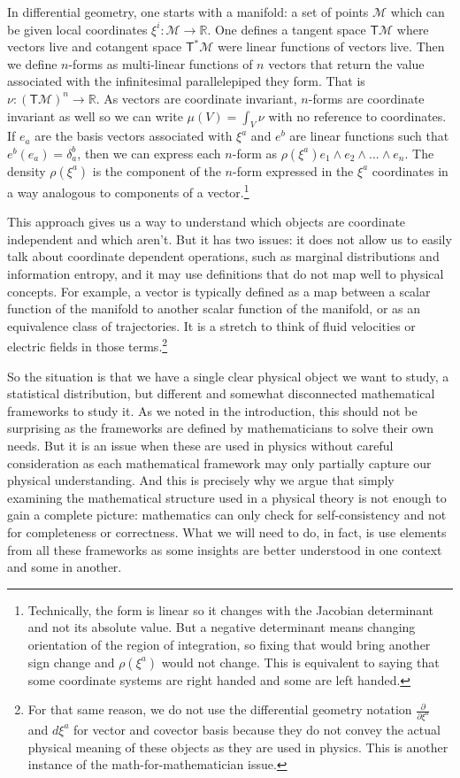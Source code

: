 \documentclass[11pt]{article}
\begin{document}
In differential geometry, one starts with a manifold: a set of points $\mathcal{M}$ which can be given local coordinates $\xi^i : \mathcal{M} \to \mathbb{R}$. One defines a tangent space $\mathsf{T}\mathcal{M}$ where vectors live and cotangent space $\mathsf{T}^*\mathcal{M}$ were linear functions of vectors live. Then we define $n$-forms as multi-linear functions of $n$ vectors that return the value associated with the infinitesimal parallelepiped they form. That is $\nu : (\mathsf{T}\mathcal{M})^n \rightarrow \mathbb{R}$. As vectors are coordinate invariant, $n$-forms are coordinate invariant as well so we can write $\mu(V)=\int_V \nu$ with no reference to coordinates. If $e_a$ are the basis vectors associated with $\xi^a$ and $e^b$ are linear functions such that $e^b(e_a)=\delta_a^b$, then we can express each $n$-form as $\rho(\xi^a)e_1\wedge e_2 \wedge ... \wedge e_n$. The density $\rho(\xi^a)$ is the component of the $n$-form expressed in the $\xi^a$ coordinates in a way analogous to components of a vector.\footnote{Technically, the form is linear so it changes with the Jacobian determinant and not its absolute value. But a negative determinant means changing orientation of the region of integration, so fixing that would bring another sign change and $\rho(\xi^a)$ would not change. This is equivalent to saying that some coordinate systems are right handed and some are left handed.}

This approach gives us a way to understand which objects are coordinate independent and which aren't. But it has two issues: it does not allow us to easily talk about coordinate dependent operations, such as marginal distributions and information entropy, and it may use definitions that do not map well to physical concepts. For example, a vector is typically defined as a map between a scalar function of the manifold to another scalar function of the manifold, or as an equivalence class of trajectories. It is a stretch to think of fluid velocities or electric fields in those terms.\footnote{For that same reason, we do not use the differential geometry notation $\frac{\partial}{\partial \xi^a}$ and $d\xi^a$ for vector and covector basis because they do not convey the actual physical meaning of these objects as they are used in physics. This is another instance of the math-for-mathematician issue.}

So the situation is that we have a single clear physical object we want to study, a statistical distribution, but different and somewhat disconnected mathematical frameworks to study it. As we noted in the introduction, this should not be surprising as the frameworks are defined by mathematicians to solve their own needs. But it is an issue when these are used in physics without careful consideration as each mathematical framework may only partially capture our physical understanding. And this is precisely why we argue that simply examining the mathematical structure used in a physical theory is not enough to gain a complete picture: mathematics can only check for self-consistency and not for completeness or correctness. What we will need to do, in fact, is use elements from all these frameworks as some insights are better understood in one context and some in another.
\end{document}

